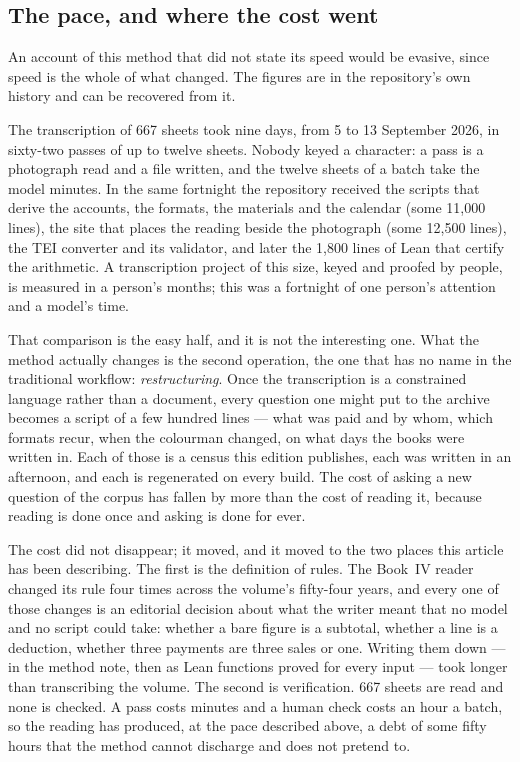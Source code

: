 \subsection{The pace, and where the cost went}

An account of this method that did not state its speed would be evasive, since
speed is the whole of what changed. The figures are in the repository's own
history and can be recovered from it.

The transcription of 667 sheets took nine days, from 5 to 13 September 2026, in
sixty-two passes of up to twelve sheets. Nobody keyed a character: a pass is a
photograph read and a file written, and the twelve sheets of a batch take the
model minutes. In the same fortnight the repository received the scripts that derive the
accounts, the formats, the materials and the calendar (some 11,000 lines), the
site that places the reading beside the photograph (some 12,500 lines), the
TEI converter and its validator, and later the 1,800 lines of Lean that
certify the arithmetic. A transcription project of this size, keyed and
proofed by people, is measured in a person's months; this was a fortnight of
one person's attention and a model's time.

That comparison is the easy half, and it is not the interesting one. What the
method actually changes is the second operation, the one that has no name in
the traditional workflow: \emph{restructuring}. Once the transcription is a
constrained language rather than a document, every question one might put to
the archive becomes a script of a few hundred lines --- what was paid and by
whom, which formats recur, when the colourman changed, on what days the books
were written in. Each of those is a census this edition publishes, each was
written in an afternoon, and each is regenerated on every build. The cost of
asking a new question of the corpus has fallen by more than the cost of reading
it, because reading is done once and asking is done for ever.

The cost did not disappear; it moved, and it moved to the two places this
article has been describing. The first is the definition of rules. The Book~IV
reader changed its rule four times across the volume's fifty-four years, and
every one of those changes is an editorial decision about what the writer meant
that no model and no script could take: whether a bare figure is a subtotal,
whether a  line is a deduction, whether three payments are three sales
or one. Writing them down --- in the method note, then as Lean functions proved
for every input --- took longer than transcribing the volume. The second is
verification. 667 sheets are read and none is checked. A pass costs minutes and
a human check costs an hour a batch, so the reading has produced, at the pace
described above, a debt of some fifty hours that the method cannot discharge
and does not pretend to.

